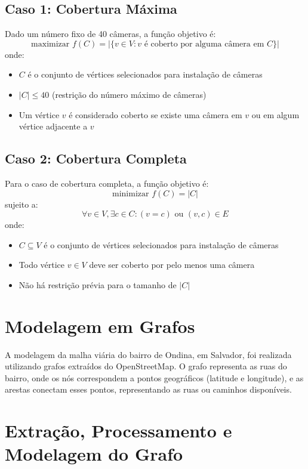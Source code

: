 \documentclass[12pt, a4paper]{report}
\begin{document}
\subsection{Caso 1: Cobertura Máxima}
Dado um número fixo de 40 câmeras, a função objetivo é:
\[ \text{maximizar } f(C) = \lvert \{v \in V : v \text{ é coberto por alguma câmera em } C\} \rvert \]
onde:
\begin{itemize}
    \item \(C\) é o conjunto de vértices selecionados para instalação de câmeras
    \item \(\lvert C \rvert \leq 40\) (restrição do número máximo de câmeras)
    \item Um vértice \(v\) é considerado coberto se existe uma câmera em \(v\) ou em algum vértice adjacente a \(v\)
\end{itemize}

\subsection{Caso 2: Cobertura Completa}
Para o caso de cobertura completa, a função objetivo é:
\[ \text{minimizar } f(C) = \lvert C \rvert \]
sujeito a:
\[ \forall v \in V, \exists c \in C : (v = c) \text{ ou } (v,c) \in E \]
onde:
\begin{itemize}
    \item \(C \subseteq V\) é o conjunto de vértices selecionados para instalação de câmeras
    \item Todo vértice \(v \in V\) deve ser coberto por pelo menos uma câmera
    \item Não há restrição prévia para o tamanho de \(\lvert C \rvert\)
\end{itemize}

\section{Modelagem em Grafos}

A modelagem da malha viária do bairro de Ondina, em Salvador, foi realizada utilizando grafos extraídos do OpenStreetMap. O grafo representa as ruas do bairro, onde os nós correspondem a pontos geográficos (latitude e longitude), e as arestas conectam esses pontos, representando as ruas ou caminhos disponíveis.

\section{Extração, Processamento e Modelagem do Grafo}
\end{document}
